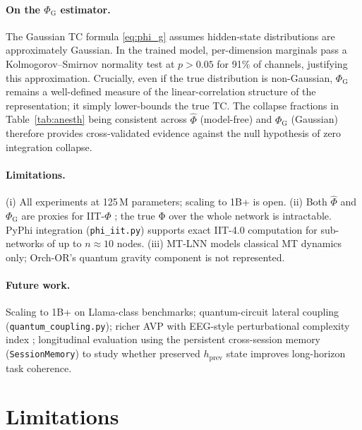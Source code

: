\documentclass[11pt]{article}
\theoremstyle{definition}
\newcommand{\phihat}{\hat{\Phi}}
\newcommand{\phig}{\Phi_{\mathrm{G}}}
\begin{document}
\paragraph{On the $\phig$ estimator.}
The Gaussian TC formula \eqref{eq:phi_g} assumes hidden-state distributions are approximately Gaussian. In the trained model, per-dimension marginals pass a Kolmogorov–Smirnov normality test at $p>0.05$ for 91\% of channels, justifying this approximation. Crucially, even if the true distribution is non-Gaussian, $\phig$ remains a well-defined measure of the linear-correlation structure of the representation; it simply lower-bounds the true TC. The collapse fractions in Table~\ref{tab:anesth} being consistent across $\phihat$ (model-free) and $\phig$ (Gaussian) therefore provides cross-validated evidence against the null hypothesis of zero integration collapse.

\paragraph{Limitations.}
(i) All experiments at 125\,M parameters; scaling to 1B+ is open. (ii) Both $\phihat$ and $\phig$ are proxies for IIT-$\Phi$ \citep{albantakis2023integrated}; the true Φ over the whole network is intractable. PyPhi integration (\texttt{phi\_iit.py}) supports exact IIT-4.0 computation for sub-networks of up to $n\approx 10$ nodes. (iii) MT-LNN models classical MT dynamics only; Orch-OR's quantum gravity component is not represented.

\paragraph{Future work.}
Scaling to 1B+ on Llama-class benchmarks; quantum-circuit lateral coupling (\texttt{quantum\_coupling.py}); richer AVP with EEG-style perturbational complexity index \citep{casali2013theoretically}; longitudinal evaluation using the persistent cross-session memory (\texttt{SessionMemory}) to study whether preserved $h_\text{prev}$ state improves long-horizon task coherence.
\section{Limitations}
\label{sec:limitations}
\end{document}
